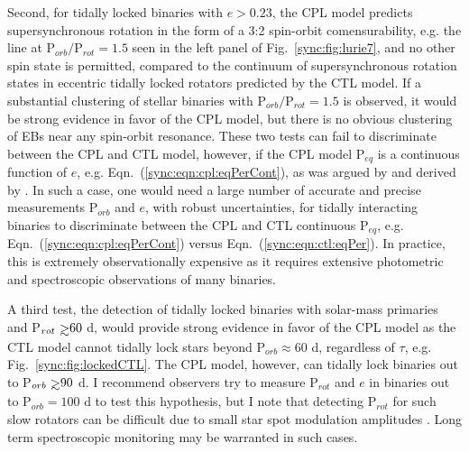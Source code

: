Second, for tidally locked binaries with $e > 0.23$, the CPL model predicts supersynchronous rotation in the form of a 3:2 spin-orbit comensurability, e.g. the line at P$_{orb}/$P$_{rot} = 1.5$ seen in the left panel of Fig.~\ref{sync:fig:lurie7}, and no other spin state is permitted, compared to the continuum of supersynchronous rotation states in eccentric tidally locked rotators predicted by the CTL model. If a substantial clustering of stellar binaries with P$_{orb}/$P$_{rot} = 1.5$ is observed, it would be strong evidence in favor of the CPL model, but there is no obvious clustering of \kepler EBs near any spin-orbit resonance. These two tests can fail to discriminate between the CPL and CTL model, however, if the CPL model P$_{eq}$ is a continuous function of $e$, e.g. Eqn.~(\ref{sync:eqn:cpl:eqPerCont}), as was argued by \citet{Goldreich1966b} and derived by \citet{Murray1999}.  In such a case, one would need a large number of accurate and precise measurements P$_{orb}$ and $e$, with robust uncertainties, for tidally interacting binaries to discriminate between the CPL and CTL continuous P$_{eq}$, e.g. Eqn.~(\ref{sync:eqn:cpl:eqPerCont}) versus Eqn.~(\ref{sync:eqn:ctl:eqPer}).  In practice, this is extremely observationally expensive as it requires extensive photometric and spectroscopic observations of many binaries. 

 A third test, the detection of tidally locked binaries with solar-mass primaries and P$_{rot} \gsim 60$ d, would provide strong evidence in favor of the CPL model as the CTL model cannot tidally lock stars beyond P$_{orb} \approx 60$ d, regardless of $\tau$, e.g. Fig.~\ref{sync:fig:lockedCTL}. The CPL model, however, can tidally lock binaries out to P$_{orb} \gsim 90$ d.  I recommend observers try to measure P$_{rot}$ and $e$ in binaries out to P$_{orb} = 100 $ d to test this hypothesis, but I note that detecting P$_{rot}$ for such slow rotators can be difficult due to small star spot modulation amplitudes \citep{McQuillan2014,Lurie2017,Reinhold2018}. Long term spectroscopic monitoring may be warranted in such cases.


